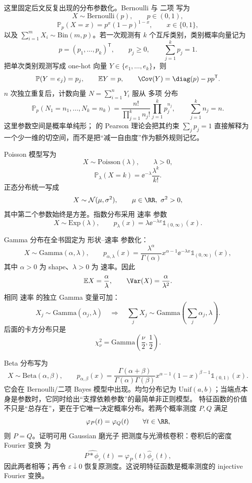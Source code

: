 这里固定后文反复出现的分布参数化。Bernoulli 与 二项 写为
\[
 X\sim\mathrm{Bernoulli}(p),\qquad p\in(0,1),
\]
\[
 \mathbb P_p(X=x)=p^x(1-p)^{1-x},\qquad x\in\{0,1\},
\]
以及 $\sum_{i=1}^mX_i\sim\mathrm{Bin}(m,p)$。若一次观测有 $k$ 个互斥类别，类别概率向量记为
\[
 p=(p_1,\ldots,p_k)^{\mathsf T},
 \qquad
 p_j\ge0,
 \qquad
 \sum_{j=1}^kp_j=1.
\]
把单次类别观测写成 one-hot 向量 $Y\in\{e_1,\ldots,e_k\}$，则
\[
 \mathbb P(Y=e_j)=p_j,
 \qquad
 \mathbb E Y=p,
 \qquad
 \Cov(Y)=\diag(p)-pp^{\mathsf T}.
\]
$n$ 次独立重复后，计数向量 $N=\sum_{i=1}^nY_i$ 服从 多项 分布
\[
 \mathbb P_p(N_1=n_1,\ldots,N_k=n_k)
 =\frac{n!}{\prod_{j=1}^kn_j!}\prod_{j=1}^kp_j^{n_j},
 \qquad
 \sum_{j=1}^kn_j=n.
\]
这里参数空间是概率单纯形； 的 Pearson 理论会把其约束 $\sum_jp_j=1$ 直接解释为一个少一维的切空间，而不是把“减一自由度”作为额外规则记忆。

Poisson 模型写为
\[
 X\sim\mathrm{Poisson}(\lambda),\qquad \lambda>0,
\]
\[
 \mathbb P_\lambda(X=k)=\ee^{-\lambda}\frac{\lambda^k}{k!}.
\]
正态分布统一写成
\[
 X\sim\mathcal N(\mu,\sigma^2),\qquad \mu\in\RR,\ \sigma^2>0,
\]
其中第二个参数始终是方差。指数分布采用 速率 参数
\[
 X\sim\mathrm{Exp}(\lambda),\qquad
 p_\lambda(x)=\lambda\ee^{-\lambda x}\mathds{1}_{(0,\infty)}(x).
\]

Gamma 分布在全书固定为 形状--速率 参数化：
\begin{equation*}X\sim\mathrm{Gamma}(\alpha,\lambda),\qquad
 p_{\alpha,\lambda}(x)
 =\frac{\lambda^\alpha}{\Gamma(\alpha)}
 x^{\alpha-1}\ee^{-\lambda x}\mathds{1}_{(0,\infty)}(x),
\end{equation*}
其中 $\alpha>0$ 为 shape、$\lambda>0$ 为 速率。因此
\[
 \mathbb E X=\frac{\alpha}{\lambda},
 \qquad
 \Var(X)=\frac{\alpha}{\lambda^2}.
\]
相同 速率 的独立 Gamma 变量可加：
\[
 X_j\sim\mathrm{Gamma}(\alpha_j,\lambda)
 \quad\Longrightarrow\quad
 \sum_jX_j\sim\mathrm{Gamma}\!\left(\sum_j\alpha_j,\lambda\right).
\]
后面的卡方分布只是
\[
 \chi^2_\nu=\mathrm{Gamma}\!\left(\frac\nu2,\frac12\right).
\]

Beta 分布写为
\[
 X\sim\mathrm{Beta}(\alpha,\beta),\qquad
 p_{\alpha,\beta}(x)
 =\frac{\Gamma(\alpha+\beta)}{\Gamma(\alpha)\Gamma(\beta)}
 x^{\alpha-1}(1-x)^{\beta-1}\mathds{1}_{(0,1)}(x).
\]
它会在 Bernoulli/二项 Bayes 模型中出现。均匀分布记为 $\mathrm{Unif}(a,b)$；当端点本身是参数时，它同时给出“支撑依赖参数”的最简单非正则模型。
特征函数的价值不只是“总存在”，更在于它唯一决定概率分布。若两个概率测度 $P,Q$ 满足
\[
\varphi_P(t)=\varphi_Q(t)
\qquad\forall t\in\RR,
\]
则 $P=Q$。证明可用 Gaussian 磨光子 把测度与光滑核卷积：卷积后的密度 Fourier 变换 为
\[
\widehat{P*\phi_\varepsilon}(t)
=\varphi_P(t)\widehat\phi_\varepsilon(t),
\]
因此两者相等；再令 $\varepsilon\downarrow0$ 恢复原测度。这说明特征函数是概率测度的 injective Fourier 变换。

